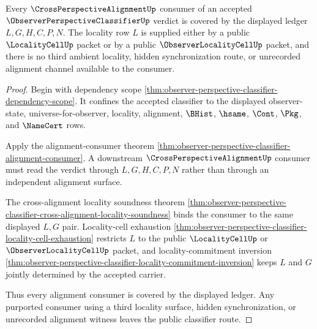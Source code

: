 \begin{theorem}
\label{thm:observer-perspective-classifier-alignment-ledger-coverage}
Every $\CrossPerspectiveAlignmentUp$ consumer of an accepted $\ObserverPerspectiveClassifierUp$ verdict is covered by the displayed ledger $L,G,H,C,P,N$. The locality row $L$ is supplied either by a public $\LocalityCellUp$ packet or by a public $\ObserverLocalityCellUp$ packet, and there is no third ambient locality, hidden synchronization route, or unrecorded alignment channel available to the consumer.
\end{theorem}
\begin{proof}
Begin with dependency scope \autoref{thm:observer-perspective-classifier-dependency-scope}. It confines the accepted classifier to the displayed observer-state, universe-for-observer, locality, alignment, $\BHist$, $\hsame$, $\Cont$, $\Pkg$, and $\NameCert$ rows.

Apply the alignment-consumer theorem \autoref{thm:observer-perspective-classifier-alignment-consumer}. A downstream $\CrossPerspectiveAlignmentUp$ consumer must read the verdict through $L,G,H,C,P,N$ rather than through an independent alignment surface.

The cross-alignment locality soundness theorem \autoref{thm:observer-perspective-classifier-cross-alignment-locality-soundness} binds the consumer to the same displayed $L,G$ pair. Locality-cell exhaustion \autoref{thm:observer-perspective-classifier-locality-cell-exhaustion} restricts $L$ to the public $\LocalityCellUp$ or $\ObserverLocalityCellUp$ packet, and locality-commitment inversion \autoref{thm:observer-perspective-classifier-locality-commitment-inversion} keeps $L$ and $G$ jointly determined by the accepted carrier.

Thus every alignment consumer is covered by the displayed ledger. Any purported consumer using a third locality surface, hidden synchronization, or unrecorded alignment witness leaves the public classifier route.
\end{proof}

